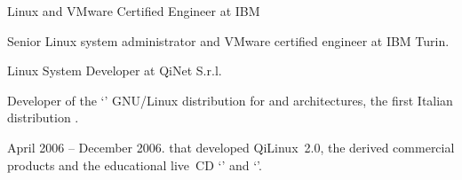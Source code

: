    {Linux and VMware Certified Engineer at IBM}

Senior Linux system administrator and VMware certified engineer at
IBM Turin.

%

%


   {Linux System Developer at QiNet S.r.l.}

Developer of the `' GNU/Linux distribution for
 and  architectures, the first Italian
distribution .

April 2006 -- December 2006.
 that developed QiLinux~2.0, the derived commercial
products
and the educational live~CD
`' and `'.

